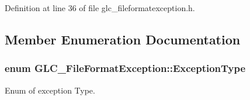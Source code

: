 Definition at line 36 of file glc\-\_\-fileformatexception.\-h.



\subsection{Member Enumeration Documentation}
\hypertarget{class_g_l_c___file_format_exception_ab28c5be439dcc7226f9fa041ff87dc18}{
\subsubsection[{Exception\-Type}]{\setlength{\rightskip}{0pt plus 5cm}enum {\bf G\-L\-C\-\_\-\-File\-Format\-Exception\-::\-Exception\-Type}}}\label{class_g_l_c___file_format_exception_ab28c5be439dcc7226f9fa041ff87dc18}


Enum of exception Type. 

